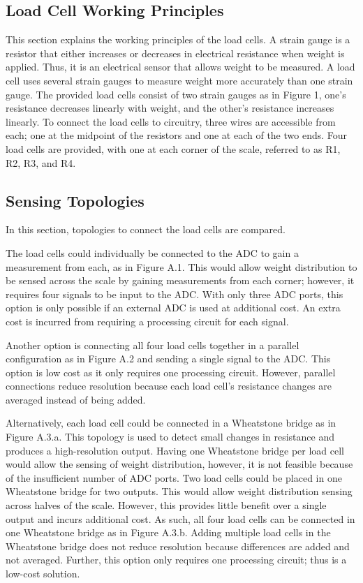 \subsection{Load Cell Working Principles}
This section explains the working principles of the load cells. A strain gauge is a resistor that either increases or decreases in electrical resistance when weight is applied. Thus, it is an electrical sensor that allows weight to be measured. A load cell uses several strain gauges to measure weight more accurately than one strain gauge. The provided load cells consist of two strain gauges as in Figure 1, one’s resistance decreases linearly with weight, and the other’s resistance increases linearly. To connect the load cells to circuitry, three wires are accessible from each; one at the midpoint of the resistors and one at each of the two ends. Four load cells are provided, with one at each corner of the scale, referred to as R1, R2, R3, and R4.

\subsection{Sensing Topologies}
In this section, topologies to connect the load cells are compared.

The load cells could individually be connected to the ADC to gain a measurement from each, as in Figure A.1. This would allow weight distribution to be sensed across the scale by gaining measurements from each corner; however, it requires four signals to be input to the ADC. With only three ADC ports, this option is only possible if an external ADC is used at additional cost. An extra cost is incurred from requiring a processing circuit for each signal.

Another option is connecting all four load cells together in a parallel configuration as in Figure A.2 and sending a single signal to the ADC. This option is low cost as it only requires one processing circuit. However, parallel connections reduce resolution because each load cell's resistance changes are averaged instead of being added.

Alternatively, each load cell could be connected in a Wheatstone bridge as in Figure A.3.a. This topology is used to detect small changes in resistance and produces a high-resolution output. Having one Wheatstone bridge per load cell would allow the sensing of weight distribution, however, it is not feasible because of the insufficient number of ADC ports. Two load cells could be placed in one Wheatstone bridge for two outputs. This would allow weight distribution sensing across halves of the scale. However, this provides little benefit over a single output and incurs additional cost. As such, all four load cells can be connected in one Wheatstone bridge as in Figure A.3.b. Adding multiple load cells in the Wheatstone bridge does not reduce resolution because differences are added and not averaged. Further, this option only requires one processing circuit; thus is a low-cost solution. 


